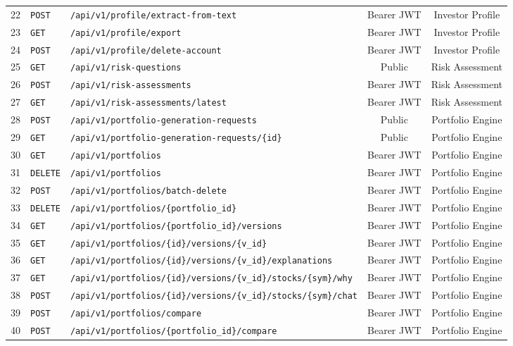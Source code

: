 \begin{small}
\begin{xltabular}{\textwidth}{llp{7.2cm}cc}
22 & \texttt{POST} & \texttt{/api/v1/profile/extract-from-text} & Bearer JWT & Investor Profile \\
23 & \texttt{GET} & \texttt{/api/v1/profile/export} & Bearer JWT & Investor Profile \\
24 & \texttt{POST} & \texttt{/api/v1/profile/delete-account} & Bearer JWT & Investor Profile \\
25 & \texttt{GET} & \texttt{/api/v1/risk-questions} & Public & Risk Assessment \\
26 & \texttt{POST} & \texttt{/api/v1/risk-assessments} & Bearer JWT & Risk Assessment \\
27 & \texttt{GET} & \texttt{/api/v1/risk-assessments/latest} & Bearer JWT & Risk Assessment \\
28 & \texttt{POST} & \texttt{/api/v1/portfolio-generation-requests} & Public & Portfolio Engine \\
29 & \texttt{GET} & \texttt{/api/v1/portfolio-generation-requests/\{id\}} & Public & Portfolio Engine \\
30 & \texttt{GET} & \texttt{/api/v1/portfolios} & Bearer JWT & Portfolio Engine \\
31 & \texttt{DELETE} & \texttt{/api/v1/portfolios} & Bearer JWT & Portfolio Engine \\
32 & \texttt{POST} & \texttt{/api/v1/portfolios/batch-delete} & Bearer JWT & Portfolio Engine \\
33 & \texttt{DELETE} & \texttt{/api/v1/portfolios/\{portfolio\_id\}} & Bearer JWT & Portfolio Engine \\
34 & \texttt{GET} & \texttt{/api/v1/portfolios/\{portfolio\_id\}/versions} & Bearer JWT & Portfolio Engine \\
35 & \texttt{GET} & \texttt{/api/v1/portfolios/\{id\}/versions/\{v\_id\}} & Bearer JWT & Portfolio Engine \\
36 & \texttt{GET} & \texttt{/api/v1/portfolios/\{id\}/versions/\{v\_id\}/explanations} & Bearer JWT & Portfolio Engine \\
37 & \texttt{GET} & \texttt{/api/v1/portfolios/\{id\}/versions/\{v\_id\}/stocks/\{sym\}/why} & Bearer JWT & Portfolio Engine \\
38 & \texttt{POST} & \texttt{/api/v1/portfolios/\{id\}/versions/\{v\_id\}/stocks/\{sym\}/chat} & Bearer JWT & Portfolio Engine \\
39 & \texttt{POST} & \texttt{/api/v1/portfolios/compare} & Bearer JWT & Portfolio Engine \\
40 & \texttt{POST} & \texttt{/api/v1/portfolios/\{portfolio\_id\}/compare} & Bearer JWT & Portfolio Engine \\

\end{xltabular}
\end{small}
